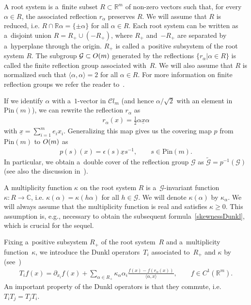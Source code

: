 \documentclass[11pt]{article}
\numberwithin{equation}{section}
\numberwithin{theorem}{section}
\numberwithin{proposition}{section}
\numberwithin{lemma}{section}
\numberwithin{corollary}{section}
\numberwithin{definition}{section}
\numberwithin{example}{section}
\numberwithin{remark}{section}
\numberwithin{note}{section}
\theoremstyle{remark}
\newcommand{\mR}{\mathbb{R}}
\newcommand{\mC}{\mathbb{C}}
\newcommand{\cC}{\mathcal{C}}
\newcommand{\cG}{\mathcal{G}}
\newcommand{\ux}{\underline{x}}
\def\k{{\kappa}}
\begin{document}
A root system is a~f\/inite subset $R\subset\mR^{m}$ of non-zero vectors such that, for every
$\alpha\in R$, the associated ref\/lection $r_{\alpha}$ preserves $R$.
We will assume that $R$ is reduced, i.e.
$R\cap\mR\alpha=\{\pm\alpha\}$ for all $\alpha\in R$.
Each root system can be written as a~disjoint union $R=R_{+}\cup(-R_{+})$, where $R_{+}$ and~$-R_{+}$ are separated by a~hyperplane through the origin.
$R_+$ is called a~positive subsystem of the root system $R$.
The subgroup $\cG\subset {\rm O}(m)$ generated by the ref\/lections $\{r_{\alpha}|\alpha\in R\}$ is
called the f\/inite ref\/lection group associated with~$R$.
We will also assume that $R$ is normalized such that $\langle\alpha,\alpha\rangle=2$ for all
$\alpha\in R$.
For more information on f\/inite ref\/lection groups we refer the reader to~\cite{Humph}.

If we identify $\alpha$ with a~$1$-vector in $\cC l_{m}$ (and hence $\alpha/\sqrt{2}$ with an
element in $\mathrm{Pin}(m)$), we can rewrite the ref\/lection $r_{\alpha}$ as
\begin{gather*}
r_{\alpha}(x)=\frac{1}{2}\alpha\ux\alpha
\end{gather*}
with $\ux=\sum\limits_{i=1}^{m}e_{i}x_{i}$.
Generalizing this map gives us the covering map $p$ from $\mathrm{Pin}(m)$ to ${\rm O}(m)$ as
\begin{gather*}
p(s)(x)=\epsilon(s)\ux s^{-1},\qquad s\in \mathrm{Pin}(m).
\end{gather*}
In particular, we obtain a~double cover of the ref\/lection group $\cG$ as $\widetilde{\cG}=
p^{-1}(\cG)$ (see also the discussion in~\cite{BCT}).

A multiplicity function $\kappa$ on the root system $R$ is a~$\cG$-invariant function $\kappa:R
\rightarrow\mC$, i.e.
$\k(\alpha)=\k(h\alpha)$ for all $h\in\cG$.
We will denote $\k(\alpha)$ by $\k_{\alpha}$.
We will always assume that the multiplicity function is real and satisf\/ies $\k\geq0$.
This assumption is, e.g., 
necessary to obtain the subsequent formula~\eqref{skewnessDunkl}, which is crucial for the sequel.

Fixing a~positive subsystem $R_{+}$ of the root system~$R$ and a~multiplicity function~$\k$, we
introduce the Dunkl operators~$T_{i}$ associated to~$R_{+}$ and $\k$ by (see~\cite{MR951883,
MR1827871})
\begin{gather*}
T_{i}f(x)=\partial_{x_{i}}f(x)+\sum_{\alpha\in R_{+}}\k_{\alpha}\alpha_{i}\frac{f(x)-
f(r_{\alpha}(x))}{\langle\alpha,x\rangle},\qquad f\in C^{1}(\mR^{m}).
\end{gather*}
An important property of the Dunkl operators is that they commute, i.e.
$T_{i}T_{j}=T_{j}T_{i}$.
\end{document}

